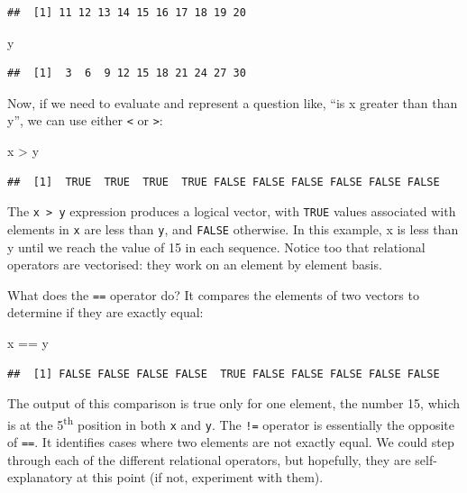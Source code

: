 \documentclass[
]{book}
\newenvironment{Shaded}{\begin{snugshade}}{\end{snugshade}}
\newcommand{\NormalTok}[1]{#1}
\newcommand{\SpecialCharTok}[1]{\textcolor[rgb]{0.00,0.00,0.00}{#1}}
\begin{document}
\begin{verbatim}
##  [1] 11 12 13 14 15 16 17 18 19 20
\end{verbatim}

\begin{Shaded}
\begin{Highlighting}[]
\NormalTok{y}
\end{Highlighting}
\end{Shaded}

\begin{verbatim}
##  [1]  3  6  9 12 15 18 21 24 27 30
\end{verbatim}

Now, if we need to evaluate and represent a question like, ``is x greater than than y'', we can use either \texttt{\textless{}} or \texttt{\textgreater{}}:

\begin{Shaded}
\begin{Highlighting}[]
\NormalTok{x }\SpecialCharTok{\textgreater{}}\NormalTok{ y}
\end{Highlighting}
\end{Shaded}

\begin{verbatim}
##  [1]  TRUE  TRUE  TRUE  TRUE FALSE FALSE FALSE FALSE FALSE FALSE
\end{verbatim}

The \texttt{x\ \textgreater{}\ y} expression produces a logical vector, with \texttt{TRUE} values associated with elements in \texttt{x} are less than \texttt{y}, and \texttt{FALSE} otherwise. In this example, x is less than y until we reach the value of 15 in each sequence. Notice too that relational operators are vectorised: they work on an element by element basis.

What does the \texttt{==} operator do? It compares the elements of two vectors to determine if they are exactly equal:

\begin{Shaded}
\begin{Highlighting}[]
\NormalTok{x }\SpecialCharTok{==}\NormalTok{ y}
\end{Highlighting}
\end{Shaded}

\begin{verbatim}
##  [1] FALSE FALSE FALSE FALSE  TRUE FALSE FALSE FALSE FALSE FALSE
\end{verbatim}

The output of this comparison is true only for one element, the number 15, which is at the 5\textsuperscript{th} position in both \texttt{x} and \texttt{y}. The \texttt{!=} operator is essentially the opposite of \texttt{==}. It identifies cases where two elements are not exactly equal. We could step through each of the different relational operators, but hopefully, they are self-explanatory at this point (if not, experiment with them).
\end{document}
